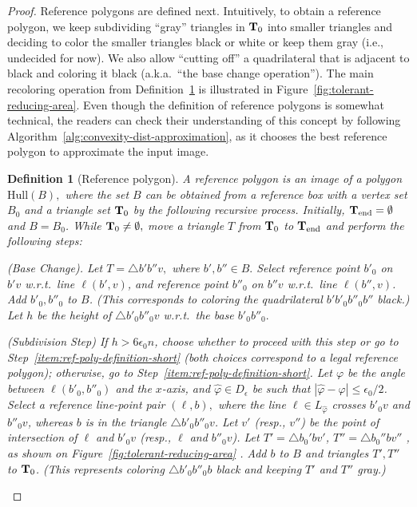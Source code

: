 \documentclass[11pt,english]{article}
\renewenvironment{enumerate}[1]{\begin{compactenum}#1}{\end{compactenum}}
\newtheorem{definition}{Definition}[section]
\numberwithin{figure}{section}
\newcommand{\hull}{\text{Hull}}
\newcommand{\Tend}{{\bf T}_{\text{end}}}
\newcommand{\Tstart}{{\bf T}_0}
\newcommand{\mydelta}{\epsilon} \newcommand{\bigdelta}{{\epsilon_0}} \newcommand{\dsquares}{d_{\rm squares}}
\begin{document}
\begin{proof}
Reference polygons are defined next.  Intuitively, to obtain a reference polygon, we keep subdividing ``gray'' triangles in $\Tstart$ into smaller triangles and deciding to color the smaller triangles black or white or keep them gray (i.e., undecided for now). We also allow ``cutting off'' a quadrilateral that is adjacent to black and coloring it black (a.k.a.\ ``the base change operation'').
\ifnum{}
The main recoloring operation from Definition~\ref{def:reference-polygons} is illustrated in Figure~\ref{fig:tolerant-reducing-area}.
\fi
Even though the definition of reference polygons is somewhat technical, the readers can check their understanding of this concept by following Algorithm~\ref{alg:convexity-dist-approximation}, as it chooses the best reference polygon to approximate the input image.

\begin{definition}[Reference polygon]\label{def:reference-polygons}
A {\em reference polygon} is an image of a polygon $\hull(B),$ where the set
$B$ can be obtained from a reference box with a vertex set $B_0$ and a triangle set $\Tstart$ by the following recursive process.
Initially, $\Tend=\emptyset$ and $B=B_0$. While $\Tstart\neq\emptyset,$ move a triangle $T$ from $\Tstart$ to $\Tend$ and
perform the following steps:


\begin{enumerate}
\item\label{item:ref-poly-definition} {\sf (Base Change).} Let $T=\bigtriangleup b'b''v,$ where
 $b',b''\in B.$ Select reference point $b'_0$ on $b'v$ w.r.t.\ line $\ell(b',v)$, and reference point $b''_0$ on $b''v$ w.r.t.\ line $\ell(b'',v)$. Add $b'_0,b''_0$ to $B$. (This corresponds to coloring the quadrilateral $b'b'_0b''_0b''$ black.) Let $h$ be the height of $\bigtriangleup b'_0b''_0v$ w.r.t.\ the base $b'_0b''_0.$



\item\label{item:ref-poly-definition-tall} {\sf (Subdivision Step)} If $h>6\bigdelta n$, choose whether to proceed with this step or go to Step~\ref{item:ref-poly-definition-short} (both choices correspond to a legal reference polygon); otherwise, go to Step~\ref{item:ref-poly-definition-short}. Let $\varphi$ be the angle between $\ell(b'_0,b''_0)$ and the $x$-axis, and $\hat\varphi\in D_\mydelta$ be such that $|\hat\varphi-\varphi|\leq {\bigdelta/2}$. Select a reference line-point pair $(\ell,b),$ where the line $\ell\in L_{\hat{\varphi}}$ crosses $b'_0v$ and $b''_0v$, whereas $b$ is in the triangle $\bigtriangleup b'_0b''_0v$. Let $v'$ (resp., $v''$) be the point of intersection of $\ell$ and $b'_0v$ (resp., $\ell$ and $b''_0v$). Let $T'=\bigtriangleup b_0'bv'$, $T''=\bigtriangleup b_0''bv''$\ifnum{}
, as shown on Figure~\ref{fig:tolerant-reducing-area}\fi
. Add $b$ to $B$ and triangles $T',T''$ to $\Tstart$. (This represents coloring $\bigtriangleup b'_0b''_0b$ black and keeping $T'$ and $T''$ gray.)


\end{enumerate}
\end{definition}
\end{proof}
\end{document}
